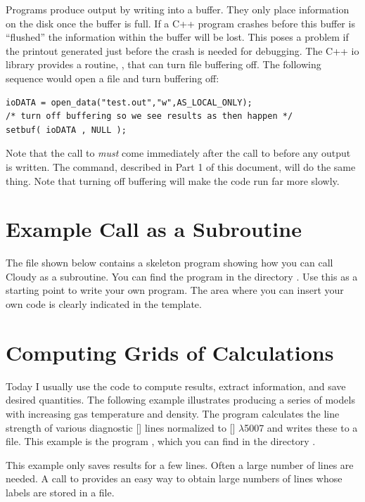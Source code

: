 Programs produce output by writing into a buffer.
They only place
information on the disk once the buffer is full.
If a C++ program
crashes before this buffer is ``flushed'' the information within the buffer
will be lost.
This poses a problem if the printout generated just before
the crash is needed for debugging.
The C++ io library provides a routine,
, that can turn file buffering off.
The following sequence would
open a file and turn buffering off:
\begin{verbatim}
ioDATA = open_data("test.out","w",AS_LOCAL_ONLY);
/* turn off buffering so we see results as then happen */
setbuf( ioDATA , NULL );
\end{verbatim}

Note that the call to  {\em must} come immediately after the
call to  before any output is written.
The  command, described in Part 1 of this document, will do the same thing.
Note that turning off buffering will make the code run far more slowly.

\section{Example Call as a Subroutine}

The file  shown below contains a skeleton program
showing how you can call Cloudy as a subroutine. You can find the program in
the directory . Use this as a starting point to
write your own program. The area where you can insert your own code is clearly
indicated in the template.
{ \setverbatimfontsize{\tiny}
}

\section{Computing Grids of Calculations}

Today I usually use the code to compute results, extract information, and save
desired quantities. The following example illustrates producing a series of
models with increasing gas temperature and density. The program calculates the
line strength of various diagnostic [\oiii] lines normalized to [\oiii]
$\lambda $5007 and writes these to a file. This example is the program
, which you can find in the directory
.

This example only saves results for a few lines. Often a large number of
lines are needed. A call to  provides an easy way to
obtain large numbers of lines whose labels are stored in a file.
{ \setverbatimfontsize{\tiny}
}
